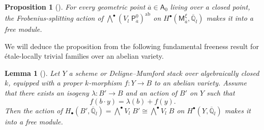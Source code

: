 \documentclass[openany]{amsbook}
\newtheorem{lemma}[theorem]{Lemma}
\newtheorem{proposition}[theorem]{Proposition}
\theoremstyle{definition}
\theoremstyle{remark}
\numberwithin{equation}{section}
\newcommand{\Q}{\mathbb{Q}}
\newcommand{\ol}[1]{\overline{#1}}
\renewcommand{\-}{\operatorname{-}}
\newcommand{\bM}{\mathsf{M}}
\newcommand{\bA}{\mathsf{A}}
\newcommand{\bP}{\mathsf{P}}
\newcommand{\ab}{\mathrm{ab}}
\newcommand{\Tate}{V_l \;}
\begin{document}
\begin{proposition}[{{\cite[Lemme 10.3.3, Th\'eor\`eme 10.5.1]{CLII}}}]\label{prop.tate.action.geo.fibers.free}
    For every geometric point $\ol{a} \in \bA_0$ living over a closed point, the Frobenius-splitting action of $\bigwedge^\bullet (\Tate \bP_{\ol{a}}^0)^{\ab}$ on $H^\bullet(\bM^\xi_{ \ol{a}}, \ol{\Q}_l)$ makes it into a free module.
\end{proposition}

We will deduce the proposition from the following fundamental freeness result for \'etale-locally trivial families over an abelian variety.

\begin{lemma}[{{\cite[Lemme 10.3.3]{CLII}}}]\label{lem.free.ab.var}
    Let $Y$ a scheme or Deligne--Mumford stack over algebraically closed $k$, equipped with a proper $k$-morphism $f : Y \to B$ to an abelian variety. Assume that there exists an isogeny $\lambda : B' \to B$ and an action of $B'$ on $Y$ such that
    $$
        f(b\cdot y) = \lambda(b) + f(y).
    $$
    Then the action of $H_\bullet(B', \ol{\Q}_l) = \bigwedge^\bullet \Tate B' \cong \bigwedge^\bullet \Tate B$ on $H^\bullet(Y, \ol{\Q}_l)$ makes it into a free module.
\end{lemma}

\end{document}
